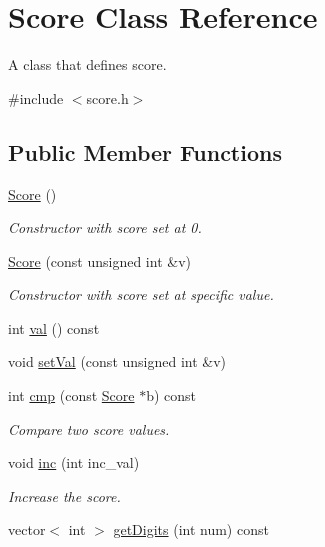 \hypertarget{class_score}{}\section{Score Class Reference}
\label{class_score}


A class that defines score.  




{\ttfamily \#include $<$score.\+h$>$}

\subsection*{Public Member Functions}
\begin{DoxyCompactItemize}
\item 
\mbox{\hyperlink{class_score_a039c99843551e5e4b512ecee99e46617}{Score}} ()
\begin{DoxyCompactList}\small\item\em Constructor with score set at 0. \end{DoxyCompactList}\item 
\mbox{\hyperlink{class_score_ad7549208ba985c6f0ddf53179a07ebcb}{Score}} (const unsigned int \&v)
\begin{DoxyCompactList}\small\item\em Constructor with score set at specific value. \end{DoxyCompactList}\item 
int \mbox{\hyperlink{class_score_a65da5e3eee257fbd78e429c8491deced}{val}} () const
\item 
void \mbox{\hyperlink{class_score_a7327b27227ff3a060036a387d9df81f4}{set\+Val}} (const unsigned int \&v)
\item 
int \mbox{\hyperlink{class_score_a9e284bd492bbc59091d671824b07de91}{cmp}} (const \mbox{\hyperlink{class_score}{Score}} $\ast$b) const
\begin{DoxyCompactList}\small\item\em Compare two score values. \end{DoxyCompactList}\item 
void \mbox{\hyperlink{class_score_a033a9d0790e42f3803d353bf2e7027e2}{inc}} (int inc\+\_\+val)
\begin{DoxyCompactList}\small\item\em Increase the score. \end{DoxyCompactList}\item 
vector$<$ int $>$ \mbox{\hyperlink{class_score_ab86681a8b679799d50117a2a21618326}{get\+Digits}} (int num) const

\end{DoxyCompactItemize}
